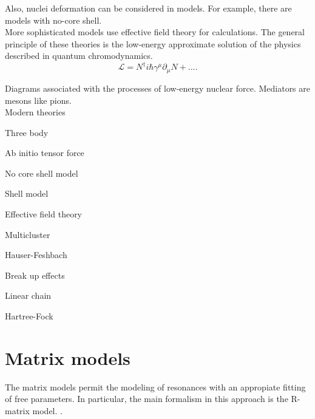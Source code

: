 \documentclass[openany]{book}
\begin{document}
Also, nuclei deformation can be considered in models. For example, there are models with no-core shell. \\

More sophisticated models use effective field theory for calculations. The general principle of these theories is the low-energy approximate solution of the physics described in quantum chromodynamics. \\

\begin{equation}
	\mathcal{L} = N^{\dagger}i\hbar\gamma^\mu\partial_\mu N + ... .
\end{equation}

Diagrams associated with the processes of low-energy nuclear force. Mediators are mesons like pions. \\

Modern theories \cite{marcucci_nollett_schiavilla_wiringa_2006}

Three body \cite{grigorenko_danilin_efros_shulgina_zhukov_1998}

Ab initio \cite{neff_feldmeier_langanke_2011}
\cite{navratil_quaglioni_hupin_romero-redondo_calci_2016}
\cite{navratil_bertulani_caurier_2006}
\cite{atkinson_navratil_hupin_kravvaris_quaglioni_2022}
tensor force \cite{arai_aoyama_suzuki_descouvemont_baye_2013}

No core shell model \cite{dohet-eraly_navratil_quaglioni_horiuchi_hupin_raimondi_2016}

Shell model \cite{dong_wang_michel_ploszajczak_2022}
\cite{tazawa_1974}

Effective field theory \cite{sadeghi_khalili_godarzi_2013}
\cite{higa_premarathna_rupak_2022}

Multicluster \cite{dufour_descouvemont_1997}
\cite{simenel_keser_umar_oberacker_2013}

Hauser-Feshbach \cite{jayatissa_avila_rehm_talwar_mohr_auranen_chen_gorelov_hoffman_jiang_et_2022}

Break up effects \cite{shubhchintak_descouvemont_2022}

Linear chain \cite{baba_taniguchi_kimura_2022}

Hartree-Fock \cite{leanh_minhloc_2022}


\section{Matrix models}  \label{sec:matrixModels}

The matrix models permit the modeling of resonances with an appropiate fitting of free parameters. In particular, the main formalism in this approach is the R-matrix model. \cite{lane_thomas_1958}.
\end{document}

